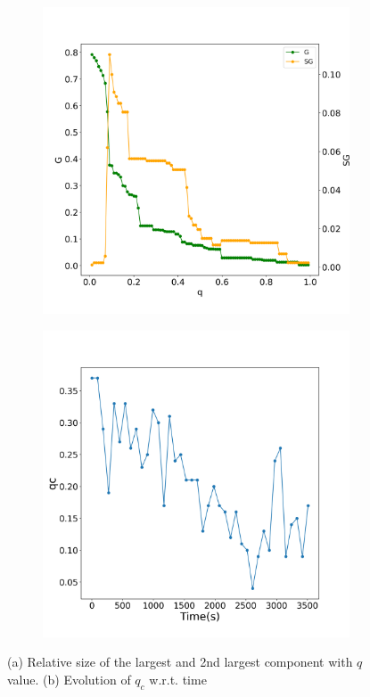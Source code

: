 \begin{figure}[bht]
\centering
\begin{subfigure}[b]{0.45\linewidth}
    \centering
    \includegraphics[width=\linewidth]{images/G and SG.png}
    \caption{}
    \label{fig: g sg}
\end{subfigure}
\hfill
\begin{subfigure}[b]{0.45\linewidth}
    \centering
    \includegraphics[width=\linewidth]{images/qc-t.png}
    \caption{}
    \label{fig: qc-t}
\end{subfigure}
\caption{(a) Relative size of the largest and 2nd largest component with $q$ value. (b) Evolution of $q_c$ w.r.t. time}
\end{figure}


